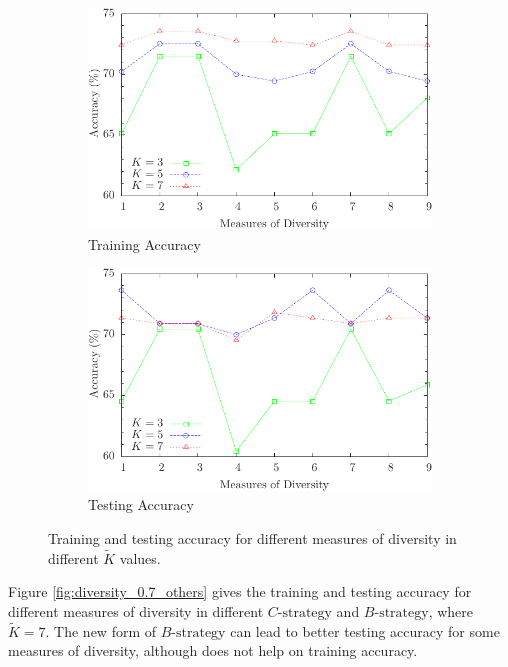 \begin{figure} [t]
\centering
\begin{subfigure}{.40\textwidth}
  \centering
  \includegraphics[width=.90\linewidth]{../Figure/diversity_k_train}
  \caption{Training Accuracy}
  \label{fig:diversity_k_train}
\end{subfigure}%
\begin{subfigure}{.40\textwidth}
  \centering
  \includegraphics[width=.90\linewidth]{../Figure/diversity_k_test}
  \caption{Testing Accuracy}
  \label{fig:diversity_k_test}
\end{subfigure}
\caption{Training and testing accuracy for different measures of diversity in different $\tilde{K}$ values.}
\label{fig:diversity_k}
\end{figure}

Figure \ref{fig:diversity_0.7_others} gives the training and testing accuracy for different measures of diversity in different $C\text{-strategy}$ and $B\text{-strategy}$, where $\tilde{K}=7$. The new form of $B\text{-strategy}$ can lead to better testing accuracy for some measures of diversity, although does not help on training accuracy.

